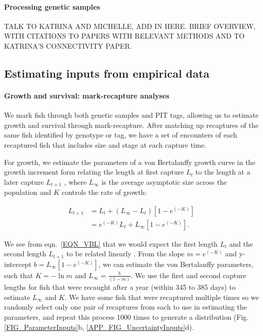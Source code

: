 \documentclass[12pt, oneside]{article}   	%
\begin{document}
\paragraph*{Processing genetic samples}

TALK TO KATRINA AND MICHELLE, ADD IN HERE. BRIEF OVERVIEW, WITH CITATIONS TO PAPERS WITH RELEVANT METHODS AND TO KATRINA'S CONNECTIVITY PAPER.

\subsection*{Estimating inputs from empirical data} %

\paragraph*{Growth and survival: mark-recapture analyses}

We mark fish through both genetic samples and PIT tags, allowing us to estimate growth and survival through mark-recapture. After matching up recaptures of the same fish identified by genotype or tag, we have a set of encounters of each recaptured fish that includes size and stage at each capture time.

For growth, we estimate the parameters of a von Bertalanffy growth curve \citep{fabens1965properties} in the growth increment form relating the length at first capture $L_t$ to the length at a later capture $L_{t+1}$ \citep{hart2009estimating}, where $L_\infty$ is the average asymptotic size across the population and $K$ controls the rate of growth: %

\begin{equation} \label{EQN_VBL} 
\begin{split}
L_{t+1} & = L_t + (L_\infty - L_t)[1 - e^{(-K)}] \\
 & = e^{(-K)}L_t + L_\infty[1 - e^{(-K)}].
\end{split}
\end{equation}

We see from eqn.\ \ref{EQN_VBL} that we would expect the first length $L_t$ and the second length $L_{t+1}$ to be related linearly \citep{hart2009estimating}. From the slope $m = e^{(-K)}$ and y-intercept $b =  L_\infty[1 - e^{(-K)}]$, we can estimate the von Bertalanffy parameters, such that $K = -\ln m$ and $L_\infty = \frac{b}{(1-m)}$. We use the first and second capture lengths for fish that were recaught after a year (within 345 to 385 days) to estimate $L_\infty$ and $K$. We have some fish that were recaptured multiple times so we randomly select only one pair of recaptures from each to use in estimating the parameters, and repeat this process 1000 times to generate a distribution (Fig. \ref{FIG_ParameterInputs}b, \ref{APP_FIG_UncertaintyInputs}d).
\end{document}
